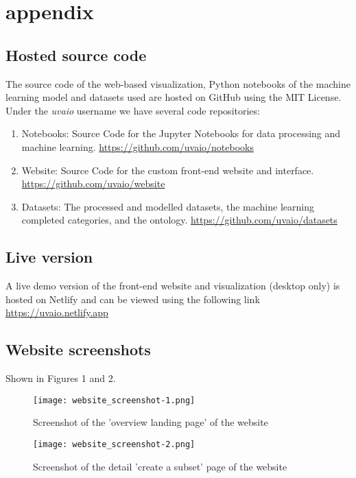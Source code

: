 \section{appendix}

\subsection{Hosted source code}

The source code of the web-based visualization, Python notebooks of the machine learning model and datasets used are hosted on GitHub using the MIT License. Under the \textit{uvaio} username we have several code repositories:

\begin{enumerate}
  \item Notebooks: Source Code for the Jupyter Notebooks for data processing and machine learning. \underline{https://github.com/uvaio/notebooks}
  \item Website: Source Code for the custom front-end website and interface. \underline{https://github.com/uvaio/website}
  \item Datasets: The processed and modelled datasets, the machine learning completed categories, and the ontology. \underline{https://github.com/uvaio/datasets}
\end{enumerate}

\subsection{Live version}
A live demo version of the front-end website and visualization (desktop only) is hosted on Netlify and can be viewed using the following link \underline{https://uvaio.netlify.app}


\subsection{Website screenshots}

Shown in Figures 1 and 2.

 \begin{figure*}[!]
    \centering
    \texttt{[image: website\_screenshot-1.png]}
    \caption{Screenshot of the 'overview landing page' of the  website}
    \label{fig:summary}
\end{figure*}

 \begin{figure*}[!]
    \centering
    \texttt{[image: website\_screenshot-2.png]}
    \caption{Screenshot of the detail 'create a subset' page of the website}
    \label{fig:subset}
\end{figure*}
